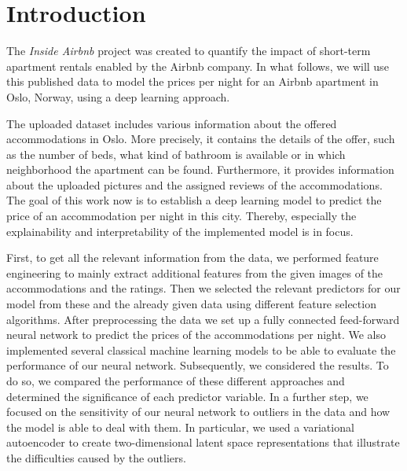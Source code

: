 \section{Introduction}


The \emph{Inside Airbnb} project \citep{cox2022} was created to quantify the impact of short-term apartment rentals enabled by the Airbnb company.
In what follows, we will use this published data to model the prices per night for an Airbnb apartment in Oslo, Norway, using a deep learning approach.

The uploaded dataset includes various information about the offered accommodations in Oslo. More precisely, it contains the details of the offer, such as the number of beds, what kind of bathroom is available or in which neighborhood the apartment can be found. Furthermore, it provides information about the uploaded pictures and the assigned reviews of the accommodations.
The goal of this work now is to establish a deep learning model to predict the price of an accommodation per night in this city. Thereby, especially the explainability and interpretability of the implemented model is in focus.

First, to get all the relevant information from the data, we performed feature engineering to mainly extract additional features from the given images of the accommodations and the ratings. Then we selected the relevant predictors for our model from these and the already given data using different feature selection algorithms. After preprocessing the data we set up a fully connected feed-forward neural network to predict the prices of the accommodations per night. We also implemented several classical machine learning models to be able to evaluate the performance of our neural network.
Subsequently, we considered the results. To do so, we compared the performance of these different approaches and determined the significance of each predictor variable. In a further step, we focused on the sensitivity of our neural network to outliers in the data and how the model is able to deal with them. In particular, we used a variational autoencoder to create two-dimensional latent space representations that illustrate the difficulties caused by the outliers.

